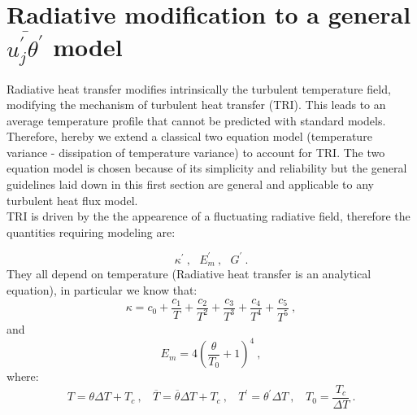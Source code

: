 \documentclass[10pt]{article}
\def\lp{\left(}
\def\rp{\right)}
\def\tm{\overline{\theta}}
\def\tr{{\theta^\prime}}
\begin{document}
\section*{Radiative modification to a general $\overline{u_j^\prime \tr}$ model}
\vspace{1cm}
Radiative heat transfer modifies intrinsically the turbulent temperature field, modifying the mechanism of turbulent heat transfer (TRI). This leads to an average temperature profile that cannot be predicted with standard models. Therefore, hereby we extend a classical two equation model (temperature variance - dissipation of temperature variance) to account for TRI. The two equation model is chosen because of its simplicity and reliability but the general guidelines laid down in this first section are general and applicable to any turbulent heat flux model. \\
TRI is driven by the the appearence of a fluctuating radiative field, therefore the quantities requiring modeling are:

\begin{equation*}
\kappa^\prime \ , \ \ \ E_m^\prime \ , \ \ \ G^\prime \ .
\end{equation*}
They all depend on temperature (Radiative heat transfer is an analytical equation), in particular we know that:
\begin{equation*}
\kappa = c_0 + \frac{c_1}{T} + \frac{c_2}{T^2} + \frac{c_3}{T^3} + \frac{c_4}{T^4} + \frac{c_5}{T^5} \ ,
\end{equation*}
and
\begin{equation*}
E_m = 4 {\lp \frac{\theta}{T_0} + 1\rp }^4 \ ,
\end{equation*}
where:
\begin{equation*}
T = \theta \Delta T + T_c \ ,  \ \ \ \ \overline{T} = \tm \Delta T+ T_c \ , \ \ \ \ T^\prime = \tr \Delta T \ , \ \ \ \ T_0 = \frac{T_c}{\Delta T} \ .
\end{equation*}
\end{document}
